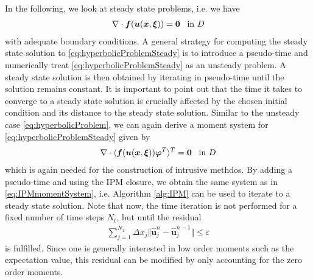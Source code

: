 In the following, we look at steady state problems, i.e. we have
\begin{align}\label{eq:hyperbolicProblemSteady}
\nabla\cdot\bm{f}(\bm{u}(\bm{x},\bm{\xi})) = \bm{0} \enskip \text{ in } D
\end{align}
with adequate boundary conditions. A general strategy for computing the steady state solution to \eqref{eq:hyperbolicProblemSteady} is to introduce a pseudo-time and numerically treat \eqref{eq:hyperbolicProblemSteady} as an unsteady problem. A steady state solution is then obtained by iterating in pseudo-time until the solution remains constant. It is important to point out that the time it takes to converge to a steady state solution is crucially affected by the chosen initial condition and its distance to the steady state solution.
Similar to the unsteady case \eqref{eq:hyperbolicProblem}, we can again derive a moment system for \eqref{eq:hyperbolicProblemSteady} given by
\begin{align}\label{eq:MomentSystemSteady}
\nabla\cdot\langle\bm{f}(\bm{u}(\bm{x},\bm{\xi}))\bm{\varphi}^T\rangle^T = \bm{0} \enskip \text{ in } D
\end{align}
which is again needed for the construction of intrusive methdos. By adding a pseudo-time and using the IPM closure, we obtain the same system as in \eqref{eq:IPMmomentSystem}, i.e. Algorithm \ref{alg:IPM} can be used to iterate to a steady state solution. Note that now, the time iteration is not performed for a fixed number of time steps $N_t$, but until the residual
\begin{align}\label{eq:residualUnsteady}
\sum_{j = 1}^{N_x} \Delta x_j \Vert \bm{\hat{u}}_j^n - \bm{\hat{u}}_j^{n-1} \Vert \leq \varepsilon
\end{align}
is fulfilled. Since one is generally interested in low order moments such as the expectation value, this residual can be modified by only accounting for the zero order moments.

